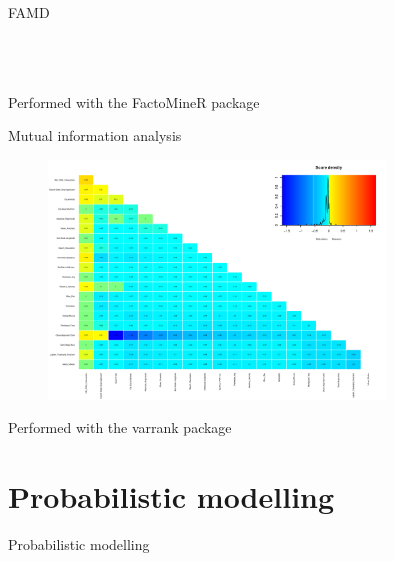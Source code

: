 \documentclass{beamer}
\begin{document}
\begin{frame}{FAMD }
\begin{columns}
\begin{figure}[h]
\begin{center}
\label{FAMD_Quantitative variables}
\end{center}
\end{figure}
\end{columns}
\begin{center}
Performed with the FactoMineR package \cite{le2008factominer} 
\end{center}
\end{frame}

\begin{frame}{Mutual information analysis}
\begin{figure}
\begin{center}
\includegraphics[width=0.8\textwidth]{Pic/Mutual_information.pdf}
\label{Mutual_information}
\end{center}
\end{figure}
\begin{center}
Performed with the varrank package \cite{kratzer2018varrank} 
\end{center}
\end{frame}

\section{Probabilistic modelling}

\begin{frame}{}
\begin{center}
{\Huge Probabilistic modelling}
\end{center}
\end{frame}
\end{document}
